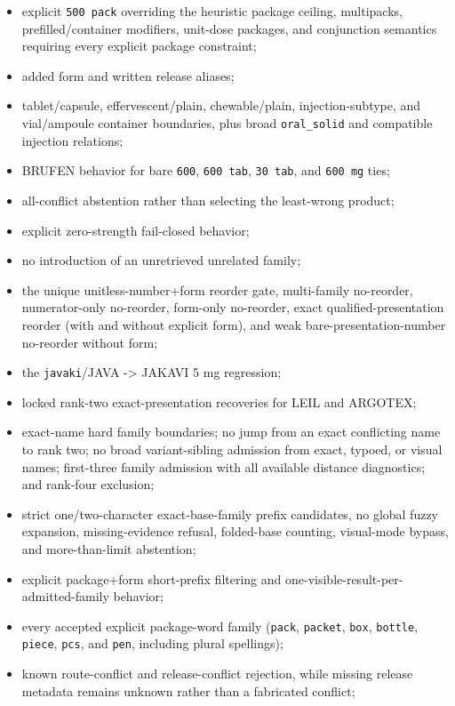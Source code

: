 \begin{itemize}
  volume/topical presentation separation from dose strength;
\item
  explicit \texttt{500\ pack} overriding the heuristic package ceiling, multipacks, prefilled/container modifiers, unit-dose packages, and conjunction semantics requiring every explicit package constraint;
\item
  added form and written release aliases;
\item
  tablet/capsule, effervescent/plain, chewable/plain, injection-subtype, and vial/ampoule container boundaries, plus broad \texttt{oral\_\allowbreak{}solid} and compatible injection relations;
\item
  BRUFEN behavior for bare \texttt{600}, \texttt{600\ tab}, \texttt{30\ tab}, and \texttt{600\ mg} ties;
\item
  all-conflict abstention rather than selecting the least-wrong product;
\item
  explicit zero-strength fail-closed behavior;
\item
  no introduction of an unretrieved unrelated family;
\item
  the unique unitless-number+form reorder gate, multi-family no-reorder, numerator-only no-reorder, form-only no-reorder, exact qualified-presentation reorder (with and without explicit form), and weak bare-presentation-number no-reorder without form;
\item
  the \texttt{javaki}/JAVA -\textgreater{} JAKAVI 5 mg regression;
\item
  locked rank-two exact-presentation recoveries for LEIL and ARGOTEX;
\item
  exact-name hard family boundaries; no jump from an exact conflicting name to rank two; no broad variant-sibling admission from exact, typoed, or visual names; first-three family admission with all available distance diagnostics; and rank-four exclusion;
\item
  strict one/two-character exact-base-family prefix candidates, no global fuzzy expansion, missing-evidence refusal, folded-base counting, visual-mode bypass, and more-than-limit abstention;
\item
  explicit package+form short-prefix filtering and one-visible-result-per-admitted-family behavior;
\item
  every accepted explicit package-word family (\texttt{pack}, \texttt{packet}, \texttt{box}, \texttt{bottle}, \texttt{piece}, \texttt{pcs}, and \texttt{pen}, including plural spellings);
\item
  known route-conflict and release-conflict rejection, while missing release metadata remains unknown rather than a fabricated conflict;

\end{itemize}
